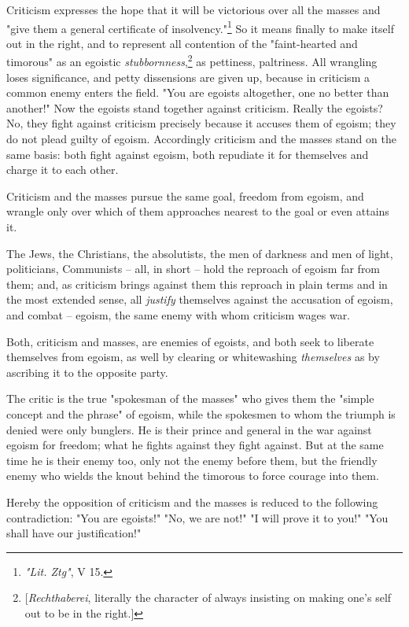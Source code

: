 Criticism expresses the hope that it will be victorious over all the masses 
and "{}give them a general certificate of 
insolvency."{}\footnote{\textit{"{}Lit. Ztg"{}}, V 15.} So it means finally to 
make itself out in the right, and to represent all contention of the 
"{}faint-hearted and timorous"{} as an egoistic 
\textit{stubbornness},\footnote{[\textit{Rechthaberei}, literally the 
character of always insisting on making one's self out to be in the right.]} 
as pettiness, paltriness. All wrangling loses significance, and petty 
dissensions are given up, because in criticism a common enemy enters the 
field. "{}You are egoists altogether, one no better than another!"{} Now the 
egoists stand together against criticism. Really the egoists? No, they fight 
against criticism precisely because it accuses them of egoism; they do not 
plead guilty of egoism. Accordingly criticism and the masses stand on the same 
basis: both fight against egoism, both repudiate it for themselves and charge 
it to each other.

Criticism and the masses pursue the same goal, freedom from egoism, and 
wrangle only over which of them approaches nearest to the goal or even attains 
it.

The Jews, the Christians, the absolutists, the men of darkness and men of 
light, politicians, Communists -- all, in short -- hold the reproach of egoism 
far from them; and, as criticism brings against them this reproach in plain 
terms and in the most extended sense, all \textit{justify} themselves against 
the accusation of egoism, and combat -- egoism, the same enemy with whom 
criticism wages war.

Both, criticism and masses, are enemies of egoists, and both seek to liberate 
themselves from egoism, as well by clearing or whitewashing 
\textit{themselves} as by ascribing it to the opposite party.

The critic is the true "{}spokesman of the masses"{} who gives them the 
"{}simple concept and the phrase"{} of egoism, while the spokesmen to whom the 
triumph is denied were only bunglers. He is their prince and general in the 
war against egoism for freedom; what he fights against they fight against. But 
at the same time he is their enemy too, only not the enemy before them, but 
the friendly enemy who wields the knout behind the timorous to force courage 
into them.

Hereby the opposition of criticism and the masses is reduced to the following 
contradiction: "{}You are egoists!"{} "{}No, we are not!"{} "{}I will prove it 
to you!"{} "{}You shall have our justification!"{}

